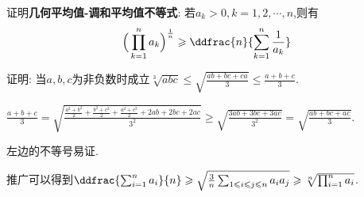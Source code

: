      \begin{exercise}
         证明\textbf{几何平均值-调和平均值不等式}: 若$a_k>0, k=1,2,\cdots,n$,则有
         \[
             \Big(\prod_{k=1}^{n}a_k\Big)^\frac{1}{n}\geqslant \ddfrac{n}{\sum_{k=1}^{n}\frac{1}{a_k}}
         \]
     \end{exercise}
     \begin{exercise}
         证明: 当$a,b,c$为非负数时成立$\sqrt[3]{abc}\leqslant \sqrt{\frac{ab+bc+ca}{3}}\leqslant \frac{a+b+c}{3}$.
     \end{exercise}
     \begin{solution}

         $\frac{a+b+c}{3}=\sqrt{\frac{\frac{a^2+b^2}{2}+\frac{b^2+c^2}{2}+\frac{a^2+c^2}{2}+2ab+2bc+2ac}{3^2}}\geqslant \sqrt{\frac{3ab+3bc+3ac}{3^2}}=\sqrt{\frac{ab+bc+ac}{3}}$.

         左边的不等号易证.

         推广可以得到$\ddfrac{\sum_{i=1}^{n}a_i}{n}\geqslant \sqrt{\frac{3}{n}\sum_{1 \leqslant i \leqslant j \leqslant n}a_ia_j}\geqslant \sqrt[n]{\prod_{i=1}^{n} a_i}$.
     \end{solution}
